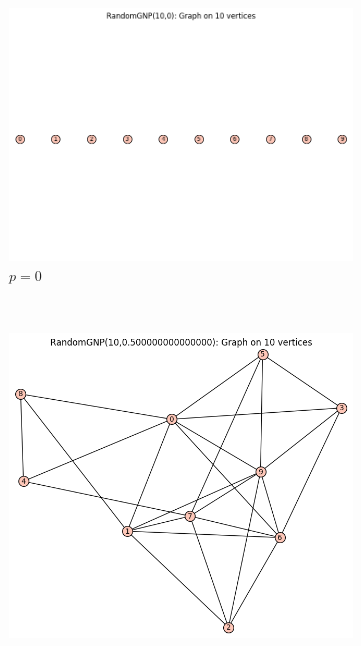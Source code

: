 \begin{figure}[h]
    \centering
    \begin{subfigure}[b]{0.3\textwidth}
        \includegraphics[scale=0.3]{images/rgraph2.png} 
        \caption{ $p =0$}
        \label{fig:a}
    \end{subfigure}
    ~ %
    \begin{subfigure}[b]{0.3\textwidth}
        \includegraphics[width=\textwidth]{images/rgraph1.png}

\end{subfigure}
\end{figure}
